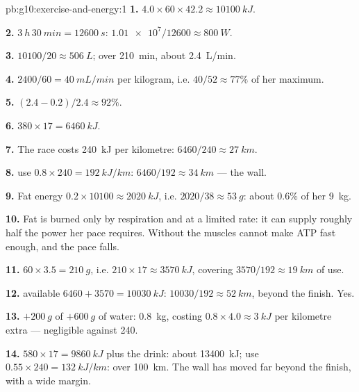 \begin{solution}{pb:g10:exercise-and-energy:1}
\textbf{1.} $4.0 \times 60 \times 42.2 \approx \qty{10100}{kJ}$.

\textbf{2.} $\qty{3}{h}\,\qty{30}{min} = \qty{12600}{s}$:
$\num{1.01e7}/12600 \approx \qty{800}{W}$.

\textbf{3.} $10100/20 \approx \qty{506}{L}$; over \qty{210}{min}, about
\qty{2.4}{L/min}.

\textbf{4.} $2400/60 = \qty{40}{mL/min}$ per kilogram, i.e. $40/52
\approx 77\%$ of her maximum.

\textbf{5.} $(2.4 - 0.2)/2.4 \approx 92\%$.

\textbf{6.} $380 \times 17 = \qty{6460}{kJ}$.

\textbf{7.} The race costs \qty{240}{kJ} per kilometre: $6460/240
\approx \qty{27}{km}$.

\textbf{8.}  use $0.8 \times 240 = \qty{192}{kJ/km}$:
$6460/192 \approx \qty{34}{km}$ --- the wall.

\textbf{9.} Fat energy $0.2 \times 10100 \approx \qty{2020}{kJ}$, i.e.
$2020/38 \approx \qty{53}{g}$: about 0.6\% of her \qty{9}{kg}.

\textbf{10.} Fat is burned only by respiration and at a limited rate:
it can supply roughly half the power her pace requires. Without
 the muscles cannot make ATP fast enough, and the pace falls.

\textbf{11.} $60 \times 3.5 = \qty{210}{g}$, i.e. $210 \times 17 \approx
\qty{3570}{kJ}$, covering $3570/192 \approx \qty{19}{km}$ of
 use.

\textbf{12.}  available $6460 + 3570 = \qty{10030}{kJ}$:
$10030/192 \approx \qty{52}{km}$, beyond the finish. Yes.

\textbf{13.} $+\qty{200}{g}$ of  $+ \qty{600}{g}$ of water:
\qty{0.8}{kg}, costing $0.8 \times 4.0 \approx \qty{3}{kJ}$ per
kilometre extra --- negligible against 240.

\textbf{14.}  $580 \times 17 = \qty{9860}{kJ}$ plus the drink:
about \qty{13400}{kJ};  use $0.55 \times 240 =
\qty{132}{kJ/km}$: over \qty{100}{km}. The wall has moved far beyond
the finish, with a wide margin.


\end{solution}

